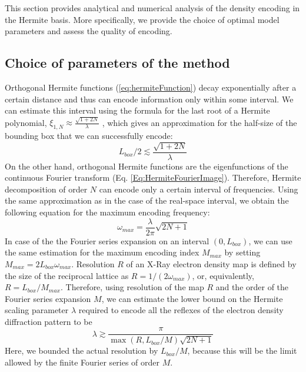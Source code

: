This section provides analytical and numerical analysis of the density encoding in the Hermite basis. More specifically, we provide the choice of optimal model parameters and assess the quality of encoding. 

\subsection{Choice of parameters of the method}
Orthogonal Hermite functions (\ref{eq:hermiteFunction}) decay exponentially
after a certain distance and thus can encode information only within
some interval. We can estimate this interval using the formula for
the last root of a Hermite polynomial, $\xi_{1,N} \approx \frac{\sqrt{1+2N}}{\lambda}$
\cite{Math1995}, which gives an approximation for the half-size
of the bounding box that we can successfully encode:
%
\begin{equation}
L_{box}/2 \lesssim \frac{\sqrt{1+2N}}{\lambda}
\label{eq:encodingRegion}
\end{equation}
On the other hand, orthogonal Hermite functions are the eigenfunctions of the continuous Fourier transform (Eq. \ref{Eq:HermiteFourierImage}).
Therefore, Hermite decomposition of order $N$ can encode only a certain interval of frequencies.
Using the same approximation as in the case of the real-space interval, we obtain the following equation for the maximum encoding frequency:
\begin{equation}
\omega_{max}=\frac{\lambda}{2\pi}\sqrt{2N+1} \label{eq:OmegaMax}
\end{equation}
%
In case of the the Fourier series expansion on an interval $(0, L_{box})$, we can
use the same estimation for the maximum encoding index $M_{max}$ by setting $M_{max}=2L_{box} \omega_{max}$.
%
Resolution $R$  of an X-Ray electron density map is defined by the size of the reciprocal lattice as $R=1/(2\omega_{max})$, or, equivalently,  $R=L_{box} /M_{max}$.
Therefore, using resolution of the map $R$ and the order of the Fourier series expansion $M$, we can estimate the lower bound on the Hermite scaling parameter $\lambda$ required to encode all the reflexes of the electron density diffraction pattern to be
\begin{equation}
\lambda\gtrsim\frac{\pi}{\max(R,L_{box}/M)\sqrt{2N+1}} \label{eq:levelOfDetails}
\end{equation}
%
Here, we bounded the actual resolution by $L_{box}/M$, because this will be the limit allowed by the finite Fourier series of order $M$. 

